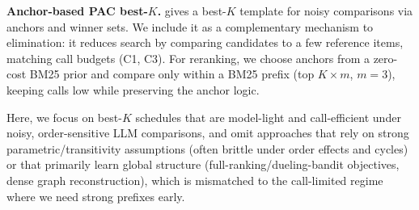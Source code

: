 \documentclass[11pt]{article}
\begin{document}
\noindent\textbf{Anchor-based PAC best-$K$.}
\citet{agarwal2022pac} gives a best-$K$ template for noisy comparisons via anchors and winner sets.
We include it as a complementary mechanism to elimination: it reduces search by comparing candidates to a few reference items, matching call budgets (C1, C3).
For reranking, we choose anchors from a zero-cost BM25 prior and compare only within a BM25 prefix (top $K{\times}m$, $m{=}3$), keeping calls low while preserving the anchor logic.

Here, we focus on best-$K$ schedules that are model-light and call-efficient under noisy, order-sensitive LLM comparisons, and omit approaches that rely on strong parametric/transitivity assumptions (often brittle under order effects and cycles) or that primarily learn global structure (full-ranking/dueling-bandit objectives, dense graph reconstruction), which is mismatched to the call-limited regime where we need strong prefixes early.





\end{document}
